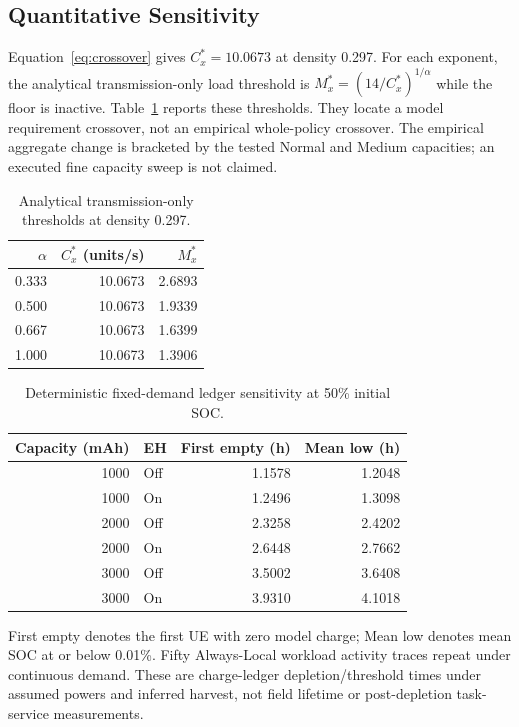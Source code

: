 \documentclass[conference]{IEEEtran}
\begin{document}
\subsection{Quantitative Sensitivity}
\label{sec:sensitivity}
Equation~\eqref{eq:crossover} gives $C_x^*=10.0673$ at density 0.297. For each exponent, the analytical transmission-only load threshold is $M_x^*=(14/C_x^*)^{1/\alpha}$ while the floor is inactive. Table~\ref{tab:alpha} reports these thresholds. They locate a model requirement crossover, not an empirical whole-policy crossover. The empirical aggregate change is bracketed by the tested Normal and Medium capacities; an executed fine capacity sweep is not claimed.
\begin{table}[t]
\centering\footnotesize
\caption{Analytical transmission-only thresholds at density 0.297.}
\label{tab:alpha}
\begin{tabular}{@{}rrr@{}}\toprule
$\alpha$ & $C_x^*$ (units/s) & $M_x^*$\\\midrule
0.333 & 10.0673 & 2.6893 \\
0.500 & 10.0673 & 1.9339 \\
0.667 & 10.0673 & 1.6399 \\
1.000 & 10.0673 & 1.3906 \\
\bottomrule\end{tabular}
\end{table}

\begin{table}[t]
\centering\footnotesize
\caption{Deterministic fixed-demand ledger sensitivity at 50\% initial SOC.}
\label{tab:battery}
\begin{tabular}{@{}rlrr@{}}\toprule
Capacity (mAh) & EH & First empty (h) & Mean low (h)\\\midrule
1000 & Off & 1.1578 & 1.2048 \\
1000 & On & 1.2496 & 1.3098 \\
2000 & Off & 2.3258 & 2.4202 \\
2000 & On & 2.6448 & 2.7662 \\
3000 & Off & 3.5002 & 3.6408 \\
3000 & On & 3.9310 & 4.1018 \\
\bottomrule\end{tabular}

\par\smallskip\begin{minipage}{\columnwidth}\footnotesize First empty denotes the first UE with zero model charge; Mean low denotes mean SOC at or below 0.01\%. Fifty Always-Local workload activity traces repeat under continuous demand. These are charge-ledger depletion/threshold times under assumed powers and inferred harvest, not field lifetime or post-depletion task-service measurements.\end{minipage}
\end{table}
\end{document}
